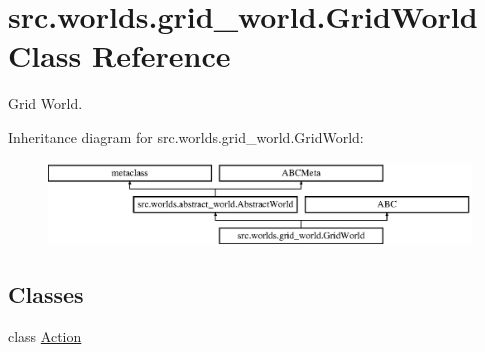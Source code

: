 \hypertarget{classsrc_1_1worlds_1_1grid__world_1_1_grid_world}{}\section{src.\+worlds.\+grid\+\_\+world.\+Grid\+World Class Reference}
\label{classsrc_1_1worlds_1_1grid__world_1_1_grid_world}


Grid World.  


Inheritance diagram for src.\+worlds.\+grid\+\_\+world.\+Grid\+World\+:\begin{figure}[H]
\begin{center}
\leavevmode
\includegraphics[height=2.240000cm]{classsrc_1_1worlds_1_1grid__world_1_1_grid_world}
\end{center}
\end{figure}
\subsection*{Classes}
\begin{DoxyCompactItemize}
\item 
class \hyperlink{classsrc_1_1worlds_1_1grid__world_1_1_grid_world_1_1_action}{Action}
\end{DoxyCompactItemize}
